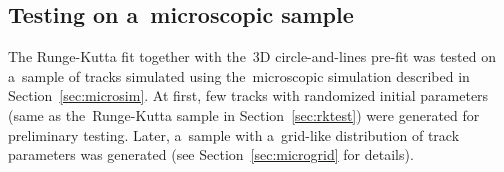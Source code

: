 		
		\subsection{Testing on a~microscopic sample}
			The Runge-Kutta fit together with the~3D circle-and-lines pre-fit was tested on a~sample of tracks simulated using the~microscopic simulation described in Section~\ref{sec:microsim}. At first, few tracks with randomized initial parameters (same as the~Runge-Kutta sample in Section~\ref{sec:rktest}) were generated for preliminary testing. Later, a~sample with a~grid-like distribution of track parameters was generated (see Section~\ref{sec:microgrid} for details).
			
